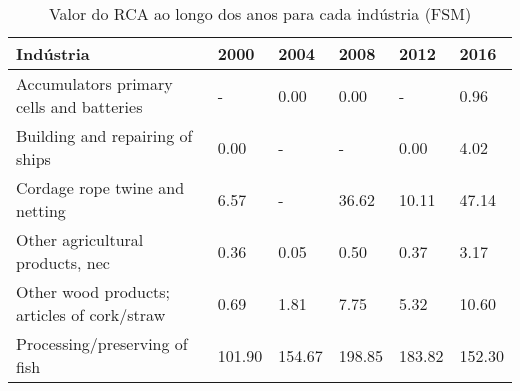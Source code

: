 \begin{table}
\centering
\caption{Valor do RCA ao longo dos anos para cada indústria (FSM)}
\begin{tabular}{p{6cm}p{1.5cm}p{1.5cm}p{1.5cm}p{1.5cm}p{1.5cm}}
\toprule
                                  Indústria &   2000 &   2004 &   2008 &   2012 &   2016 \\
\midrule
   Accumulators primary cells and batteries &      - &   0.00 &   0.00 &      - &   0.96 \\
            Building and repairing of ships &   0.00 &      - &      - &   0.00 &   4.02 \\
             Cordage rope twine and netting &   6.57 &      - &  36.62 &  10.11 &  47.14 \\
           Other agricultural products, nec &   0.36 &   0.05 &   0.50 &   0.37 &   3.17 \\
Other wood products; articles of cork/straw &   0.69 &   1.81 &   7.75 &   5.32 &  10.60 \\
              Processing/preserving of fish & 101.90 & 154.67 & 198.85 & 183.82 & 152.30 \\
\bottomrule
\end{tabular}
\end{table}
